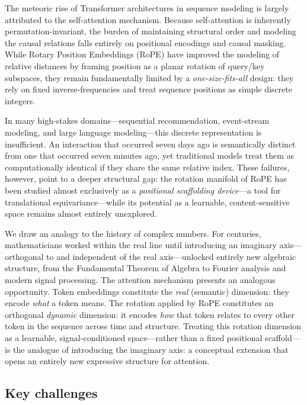 \documentclass{article}
\begin{document}
The meteoric rise of Transformer architectures in sequence modeling is largely attributed to the self-attention mechanism. Because self-attention is inherently permutation-invariant, the burden of maintaining structural order and modeling the causal relations falls entirely on positional encodings and causal masking. While Rotary Position Embeddings (RoPE) \citep{su2024roformer} have improved the modeling of relative distances by framing position as a planar rotation of query/key subspaces, they remain fundamentally limited by a \textit{one-size-fits-all} design: they rely on fixed inverse-frequencies and treat sequence positions as simple discrete integers.

In many high-stakes domains---sequential recommendation, event-stream modeling, and large language modeling---this discrete representation is insufficient. An interaction that occurred seven days ago is semantically distinct from one that occurred seven minutes ago, yet traditional models treat them as computationally identical if they share the same relative index. These failures, however, point to a deeper structural gap: the rotation manifold of RoPE has been studied almost exclusively as a \emph{positional scaffolding device}---a tool for translational equivariance---while its potential as a learnable, content-sensitive space remains almost entirely unexplored.

We draw an analogy to the history of complex numbers. For centuries, mathematicians worked within the real line until introducing an imaginary axis---orthogonal to and independent of the real axis---unlocked entirely new algebraic structure, from the Fundamental Theorem of Algebra to Fourier analysis and modern signal processing. The attention mechanism presents an analogous opportunity. Token embeddings constitute the \emph{real} (semantic) dimension: they encode \emph{what} a token means. The rotation applied by RoPE constitutes an orthogonal \emph{dynamic} dimension: it encodes \emph{how} that token relates to every other token in the sequence across time and structure. Treating this rotation dimension as a learnable, signal-conditioned space---rather than a fixed positional scaffold---is the analogue of introducing the imaginary axis: a conceptual extension that opens an entirely new expressive structure for attention.

\subsection{Key challenges}
\end{document}
